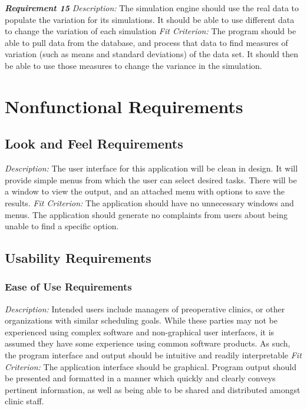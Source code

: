 \documentclass[12pt, titlepage]{article}
\begin{document}
\noindent\textbf{\textit{Requirement 15}}\newline
\textit{Description:}\newline
The simulation engine should use the real data to populate the variation for its simulations. It should be able to use different data to change the variation of each simulation
\newline\newline
\textit{Fit Criterion:}\newline 
The program should be able to pull data from the database, and process that data to find measures of variation (such as means and standard deviations) of the data set. It should then be able to use those measures to change the variance in the simulation. \newline


\section{Nonfunctional Requirements}
\subsection{Look and Feel Requirements}
\textit{Description:}\newline
The user interface for this application will be clean in design. It will provide simple menus from which the user can select desired tasks. There will be a window to view the output, and an attached menu with options to save the results. 
\newline \newline 
\textit{Fit Criterion:}\newline 
The application should have no unnecessary windows and menus.
The application should generate no complaints from users about being unable to find a specific option.
\subsection{Usability Requirements}
\subsubsection{Ease of Use Requirements}
\textit{Description:}\newline
Intended users include managers of preoperative clinics, or other organizations with similar scheduling goals. While these parties may not be experienced using complex software and non-graphical user interfaces, it is assumed they have some experience using common software products. As such, the program interface and output should be intuitive and readily interpretable
\newline \newline 
\textit{Fit Criterion:}\newline 
The application interface should be graphical.
Program output should be presented and formatted in a manner which quickly and clearly conveys pertinent information, as well as being able to be shared and distributed amongst clinic staff.
\end{document}
